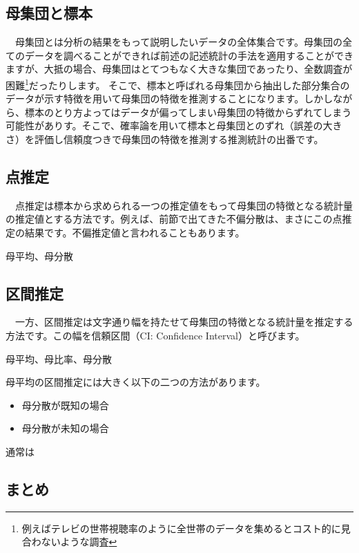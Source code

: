 \documentclass[
  12pt,
]{book}
\providecommand{\tightlist}{%
  \setlength{\itemsep}{0pt}\setlength{\parskip}{0pt}}
\begin{document}
\hypertarget{ux6bcdux96c6ux56e3ux3068ux6a19ux672c}{%
\subsection{母集団と標本}\label{ux6bcdux96c6ux56e3ux3068ux6a19ux672c}}

　母集団とは分析の結果をもって説明したいデータの全体集合です。母集団の全てのデータを調べることができれば前述の記述統計の手法を適用することができますが、大抵の場合、母集団はとてつもなく大きな集団であったり、全数調査が困難\footnote{例えばテレビの世帯視聴率のように全世帯のデータを集めるとコスト的に見合わないような調査}だったりします。 そこで、標本と呼ばれる母集団から抽出した部分集合のデータが示す特徴を用いて母集団の特徴を推測することになります。しかしながら、標本のとり方よってはデータが偏ってしまい母集団の特徴からずれてしまう可能性がありす。そこで、確率論を用いて標本と母集団とのずれ（誤差の大きさ）を評価し信頼度つきで母集団の特徴を推測する推測統計の出番です。

\hypertarget{ux70b9ux63a8ux5b9a}{%
\subsection{点推定}\label{ux70b9ux63a8ux5b9a}}

　点推定は標本から求められる一つの推定値をもって母集団の特徴となる統計量の推定値とする方法です。例えば、前節で出てきた不偏分散は、まさにこの点推定の結果です。不偏推定値と言われることもあります。

母平均、母分散

\hypertarget{ux533aux9593ux63a8ux5b9a}{%
\subsection{区間推定}\label{ux533aux9593ux63a8ux5b9a}}

　一方、区間推定は文字通り幅を持たせて母集団の特徴となる統計量を推定する方法です。この幅を信頼区間（CI: Confidence Interval）と呼びます。

母平均、母比率、母分散

母平均の区間推定には大きく以下の二つの方法があります。

\begin{itemize}
\tightlist
\item
  母分散が既知の場合
\item
  母分散が未知の場合
\end{itemize}

通常は

\hypertarget{ux307eux3068ux3081-2}{%
\subsection{まとめ}\label{ux307eux3068ux3081-2}}
\end{document}
